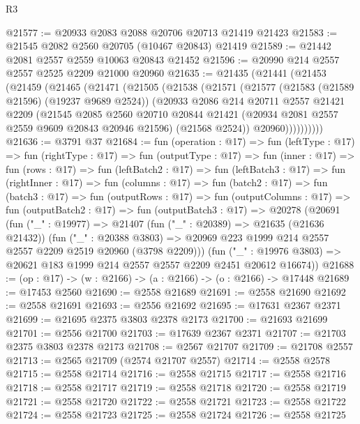 \begin{lexlean}{R3}
\begin{coremodule}
@21577 := @20933 @2083 @2088 @20706 @20713 @21419 @21423
@21583 := @21545 @2082 @2560 @20705 (@10467 @20843) @21419
@21589 := @21442 @2081 @2557 @2559 @10063 @20843 @21452
@21596 := @20990 @214 @2557 @2557 @2525 @2209 @21000 @20960
@21635 := @21435
    (@21441
      (@21453
        (@21459
          (@21465
            (@21471
              (@21505
                (@21538
                  (@21571
                    (@21577
                      (@21583 (@21589 @21596) (@19237 @9689 @2524))
                      (@20933
                        @2086
                        @214
                        @20711
                        @2557
                        @21421
                        @2209
                        (@21545
                          @2085
                          @2560
                          @20710
                          @20844
                          @21421
                          (@20934 @2081 @2557 @2559 @9609 @20843 @20946 @21596)
                          (@21568 @2524))
                        @20960))))))))))
@21636 := @3791 @37
@21684 := fun (operation : @17) =>
  fun (leftType : @17) =>
  fun (rightType : @17) =>
  fun (outputType : @17) =>
  fun (inner : @17) =>
  fun (rows : @17) =>
  fun (leftBatch2 : @17) =>
  fun (leftBatch3 : @17) =>
  fun (rightInner : @17) =>
  fun (columns : @17) =>
  fun (batch2 : @17) =>
  fun (batch3 : @17) =>
  fun (outputRows : @17) =>
  fun (outputColumns : @17) =>
  fun (outputBatch2 : @17) =>
  fun (outputBatch3 : @17) =>
  @20278
    (@20691
      (fun ("_" : @19977) =>
      @21407
        (fun ("_" : @20389) => @21635 (@21636 @21432))
        (fun ("_" : @20388 @3803) =>
        @20969 @223 @1999 @214 @2557 @2557 @2209 @2519 @20960 (@3798 @2209)))
      (fun ("_" : @19976 @3803) => @20621 @183 @1999 @214 @2557 @2557 @2209 @2451 @20612 @16674))
@21688 := (op : @17) -> (w : @2166) -> (a : @2166) -> (o : @2166) -> @17448
@21689 := @17453 @2560
@21690 := @2558 @21689
@21691 := @2558 @21690
@21692 := @2558 @21691
@21693 := @2556 @21692
@21695 := @17631 @2367 @2371
@21699 := @21695 @2375 @3803 @2378 @2173
@21700 := @21693 @21699
@21701 := @2556 @21700
@21703 := @17639 @2367 @2371
@21707 := @21703 @2375 @3803 @2378 @2173
@21708 := @2567 @21707
@21709 := @21708 @2557
@21713 := @2565 @21709 (@2574 @21707 @2557)
@21714 := @2558 @2578
@21715 := @2558 @21714
@21716 := @2558 @21715
@21717 := @2558 @21716
@21718 := @2558 @21717
@21719 := @2558 @21718
@21720 := @2558 @21719
@21721 := @2558 @21720
@21722 := @2558 @21721
@21723 := @2558 @21722
@21724 := @2558 @21723
@21725 := @2558 @21724
@21726 := @2558 @21725

\end{coremodule}
\end{lexlean}
